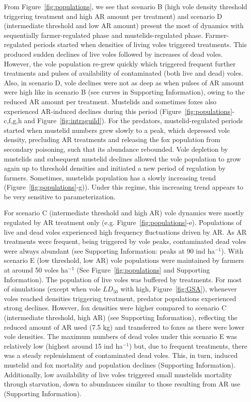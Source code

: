 \documentclass[11pt]{article}
\begin{document}
From Figure~\ref{fig:populations}, we see that scenario B (high vole density threshold triggering treatment and high AR amount per treatment) and scenario D (intermediate threshold and low AR amount) present the most of dynamics with sequentially farmer-regulated phase and mustelids-regulated phase.
%
Farmer-regulated periods started when densities of living voles triggered treatments. This produced sudden declines of live voles followed by increases of dead voles. However, the vole population re-grew quickly which triggered frequent further treatments and pulses of availability of contaminated (both live and dead) voles.
%
Also, in scenario D, vole declines were not as deep as when pulses of AR amount were high like in scenario B (see curves in Supporting Information), owing to the reduced AR amount per treatment. 
%
Mustelids and sometimes foxes also experienced AR-induced declines during this period (Figure~\ref{fig:populations}-c,f,g,h and Figure~\ref{fig:intraguild}). For the predators, mustelid-regulated periods started when mustelid numbers grew slowly to a peak, which depressed vole density, precluding AR treatments and releasing the fox population from secondary poisoning, such that its abundance rebounded. Vole depletion by mustelids and subsequent mustelid declines allowed the vole population to grow again up to threshold densities and initiated a new period of regulation by farmers.
%
Sometimes, mustelids population has a slowly increasing trend (Figure~\ref{fig:populations}-g)). Under this regime, this increasing trend appears to be very sensitive to parameterization.

For scenario C (intermediate threshold and high AR) vole dynamics were mostly regulated by AR treatment only (e.g. Figure~\ref{fig:populations}-e). Populations of live and dead voles experienced high frequency fluctuations driven by AR. As AR treatments were frequent, being triggered by vole peaks, contaminated dead voles were always abundant (see Supporting Information: peaks at 90 ind ha$^{-1}$).
%
With scenario E (low threshold, low AR) vole populations were maintained by farmers at around 50 voles ha$^{-1}$ (See Figure~\ref{fig:populations} and Supporting Information).
%
The population of live voles was buffered by treatments. 
%
For most of simulations (except when vole $LD_{50}$ with high, Figure~\ref{fig:GSA}), whenever voles reached densities triggering treatment, predator populations experienced strong declines.
%
However, fox densities were higher compared to scenario C (intermediate threshold, high AR) (see Supporting Information), reflecting the reduced amount of AR used (7.5 kg) and transferred to foxes as there were lower vole densities.
%
The maximum numbers of dead voles under this scenario E was relatively low (highest around 15 ind ha$^{-1}$) but, due to frequent treatments, there was a steady replenishment of contaminated dead voles. This, in turn, induced mustelid and fox mortality and population declines (Supporting Information).
%
Additionally, low availability of live voles triggered small mustelids mortality through starvation, down to abundances similar to those resulting from AR use (Supporting Information). 
\end{document}
